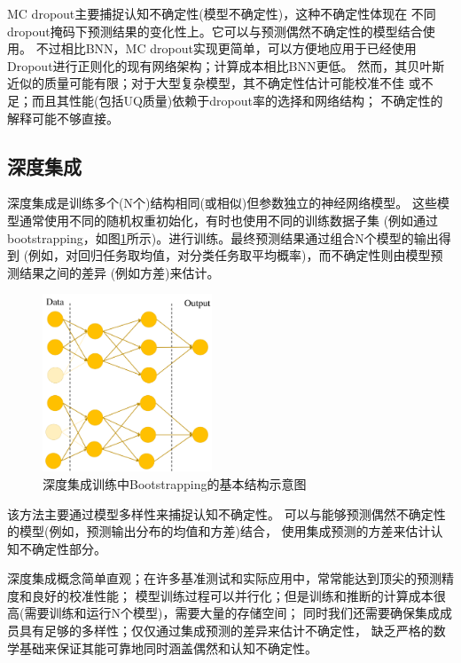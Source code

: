 MC dropout主要捕捉认知不确定性(模型不确定性)，这种不确定性体现在
不同dropout掩码下预测结果的变化性上。它可以与预测偶然不确定性的模型结合使用。
不过相比BNN，MC dropout实现更简单，可以方便地应用于已经使用
Dropout进行正则化的现有网络架构；计算成本相比BNN更低。
然而，其贝叶斯近似的质量可能有限；对于大型复杂模型，其不确定性估计可能校准不佳
或不足；而且其性能(包括UQ质量)依赖于dropout率的选择和网络结构；
不确定性的解释可能不够直接。

\subsection{深度集成}

深度集成是训练多个(N个)结构相同(或相似)但参数独立的神经网络模型。\cite{NIPS2017_9ef2ed4b}
这些模型通常使用不同的随机权重初始化，有时也使用不同的训练数据子集
(例如通过bootstrapping，如图\ref{boosttrap}所示)。进行训练。最终预测结果通过组合N个模型的输出得到
(例如，对回归任务取均值，对分类任务取平均概率)，而不确定性则由模型预测结果之间的差异
(例如方差)来估计。

\begin{figure}
    \centering
    \includegraphics[width=0.45\textwidth]{figures/BootstrapModel.pdf}
    \caption{深度集成训练中Bootstrapping的基本结构示意图\cite{DBLP:journals/corr/abs-2011-06225}}
    \label{boosttrap}
\end{figure}

该方法主要通过模型多样性来捕捉认知不确定性。
可以与能够预测偶然不确定性的模型(例如，预测输出分布的均值和方差)结合，
使用集成预测的方差来估计认知不确定性部分。

深度集成概念简单直观；在许多基准测试和实际应用中，常常能达到顶尖的预测精度和良好的校准性能；
模型训练过程可以并行化；但是训练和推断的计算成本很高(需要训练和运行N个模型)，需要大量的存储空间；
同时我们还需要确保集成成员具有足够的多样性；仅仅通过集成预测的差异来估计不确定性，
缺乏严格的数学基础来保证其能可靠地同时涵盖偶然和认知不确定性。

